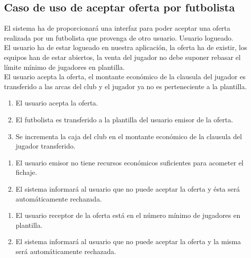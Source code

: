 \subsection{Caso de uso de aceptar oferta por futbolista}
 El sistema ha de proporcionará una interfaz para poder
aceptar una oferta realizada por un futbolista que provenga de otro usuario.
 Usuario logueado. \\
 El usuario ha de estar logueado en nuestra aplicación,
la oferta ha de existir, los equipos han de estar abiertos, la venta del jugador
no debe suponer rebasar el límite
mínimo de jugadores en plantilla. \\
 El usuario acepta la oferta, el montante económico de
la clausula del jugador es transferido a las arcas del club y el jugador ya no
es perteneciente a la plantilla.  
\begin{enumerate}
\item El usuario acepta la oferta.
\item El futbolista es transferido a la plantilla del usuario emisor de la
  oferta.
\item Se incrementa la caja del club en el montante económico de la clausula del
  jugador transferido.
\end{enumerate}
\begin{enumerate}
\item El usuario emisor no tiene recursos económicos suficientes para acometer
  el fichaje.
\item El sistema informará al usuario que no puede aceptar la oferta y ésta será
  automáticamente rechazada.
\end{enumerate}
\begin{enumerate}
\item El usuario receptor de la oferta está en el número mínimo de jugadores en
  plantilla.
\item El sistema informará al usuario que no puede aceptar la oferta y la misma
  será automáticamente rechazada.
\end{enumerate}
